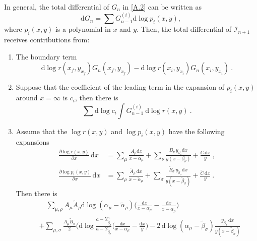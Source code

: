 \documentclass[a4paper,12pt]{article}
\newcommand{\dif}{\mathrm{d}} %
\begin{document}
In general, the total differential of $G_{n}$ in \eqref{A.2} can be written as
\begin{equation}
    \dif G_{n} = \sum G_{n-1}^{(i)} \dif \log p_{i}(x,y),
\end{equation}
where $p_{i}(x,y)$ is a polynomial in $x$ and $y$. Then, the total differential of $\mathscr{I}_{n+1}$ receives contributions from:
\begin{enumerate}[label=(\roman*)]
     \item The boundary term
    \begin{equation}
         \dif \log r(x_{f},y_{x_{f}}) G_{n}(x_{f},y_{x_{f}})- \dif \log r(x_{i},y_{x_{i}}) G_{n}(x_{i},y_{x_{i}}) \:. 
     \end{equation}
     \item Suppose that the coefficient of the leading term in the expansion of $p_{i}(x,y)$ around $x=\infty$ is $c_{i}$, then there is
     \begin{equation}
         \sum \dif \log c_{i} \int G_{n-1}^{(i)}\: \dif \log r(x,y) \:. 
     \end{equation}
     \item Assume that the $\log r(x,y)$ and $\log p_{i}(x,y)$ have the following expansions
     \begin{align*}
         \frac{\partial\log r(x,y)}{\partial x}\,\dif x&= \sum_{\mu} \frac{A_{\mu}\dif x}{x-\alpha_{\mu}} + \sum_{\nu} \frac{B_{\nu}\, y_{\beta_{\nu}}\dif x}{y(x-\beta_{\nu})} + \frac{C\,\dif x}{y} \:, \\
         \frac{\partial\log p_{i}(x,y)}{\partial x}\,\dif x&= \sum_{\rho} \frac{\tilde{A}_{\rho}\,\dif x}{x-\tilde{\alpha}_{\rho}} + \sum_{\sigma} \frac{\tilde{B}_{\sigma}\, y_{\tilde{\beta}_{\sigma}}\dif x}{y(x-\tilde{\beta}_{\sigma})} + \frac{\tilde{C}\,\dif x}{y}  \:.
     \end{align*}
     Then there is 
     \begingroup
\allowdisplaybreaks
     \begin{align}
         &\quad  \sum_{\mu,\rho}A_{\mu}\tilde{A}_{\rho} \dif \log(\alpha_{\mu}-\tilde{\alpha}_{\rho})\biggl(\frac{\dif x}{x-\alpha_{\mu}}-\frac{\dif x}{x-\tilde{\alpha}_{\rho}}\biggr) \nonumber  \\
         &+\sum_{\mu,\sigma}\frac{A_{\mu}\tilde{B}_{\sigma}}{2}\Biggl( \dif \log\frac{a-Y_{\tilde{\beta}_{\sigma}}^{+}}{a-Y_{\tilde{\beta}_{\sigma}}^{-}} \biggl(\frac{\dif x}{x-\alpha_{\mu}}-\frac{\dif x}{y}\biggr) - 2\,\dif \log(\alpha_{\mu}-\tilde{\beta}_{\sigma}) \frac{y_{\tilde{\beta}_{\sigma}}\,\dif x}{y(x-\tilde{\beta}_{\sigma})} \nonumber \\

\end{align}
\end{enumerate}
\end{document}
